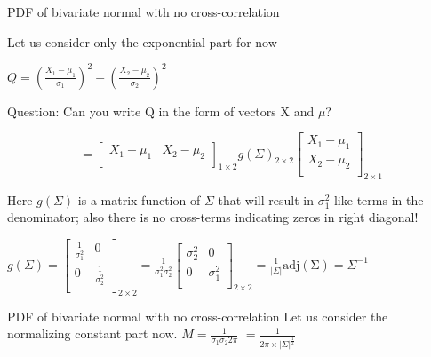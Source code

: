 \documentclass{beamer}
\begin{document}
\begin{frame}{PDF of bivariate normal with no cross-correlation}

Let us consider only the exponential part for now

$ Q =  \left(\frac{X_1-\mu_1}{\sigma_1}\right)^2 + \left(\frac{X_2-\mu_2}{\sigma_2}\right)^2 $

Question: Can you write Q in the form of vectors X and $\mu$?

$$
 = \begin{bmatrix}
	X_1 - \mu_1 &
	X_2 - \mu_2 \\
\end{bmatrix}_{1\times2}  g(\Sigma)_{2\times2} \begin{bmatrix}
X_1 - \mu_1 \\
X_2 - \mu_2 \\
\end{bmatrix}_{2\times1}
$$

Here $g(\Sigma)$ is a matrix function of $\Sigma$ that will result in $\sigma_1^2$ like terms in the denominator; also there is no cross-terms indicating zeros in right diagonal!

$g(\Sigma) = \begin{bmatrix}
 \frac{1}{\sigma_1^2}& 0  \\
 0 &  \frac{1}{\sigma_2^2} \\
\end{bmatrix}_{2\times2} = \frac{1}{\sigma_1^2 \sigma_2^2}\begin{bmatrix}
{\sigma_2^2}& 0  \\
0 &  {\sigma_1^2}   \\ 
\end{bmatrix}_{2\times2} = \frac{1}{|\Sigma|} \operatorname{adj(\Sigma)} = \Sigma^{-1}$
\end{frame}


\begin{frame}{PDF of bivariate normal with no cross-correlation}
Let us consider the normalizing constant part now.
$M = \frac{1}{\sigma_1 \sigma_2 2\pi }$
$=\frac{1}{2\pi \times |\Sigma|^{\frac{1}{2}}}$
\end{frame}
\end{document}
